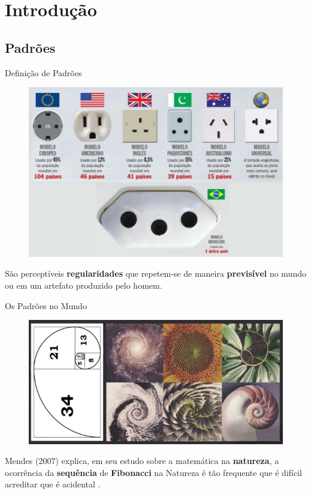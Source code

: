\section{Introdução}

\subsection{Padrões}
    \begin{frame}[fragile]{Definição de Padrões}
        \begin{figure}[H]
        \begin{center}
            \includegraphics[scale=0.50]{images/padroes.png}
        \end{center}
        \end{figure}

        São perceptíveis \textbf{regularidades} que repetem-se de maneira
        \textbf{previsível} no  mundo ou em um artefato produzido pelo homem.
    \end{frame}

    \begin{frame}[fragile]{Os Padrões no Mundo}
        \begin{figure}[H]
        \begin{center}
            \includegraphics[scale=0.60]{images/padroes_mundo.png}
        \end{center}
        \end{figure}

        Mendes (2007) explica, em seu estudo sobre a matemática na
        \textbf{natureza}, a ocorrência da \textbf{sequência} de
        \textbf{Fibonacci} na Natureza é tão frequente que é difícil acreditar
        que é acidental \cite{mendes2007matematica}.
    \end{frame}

